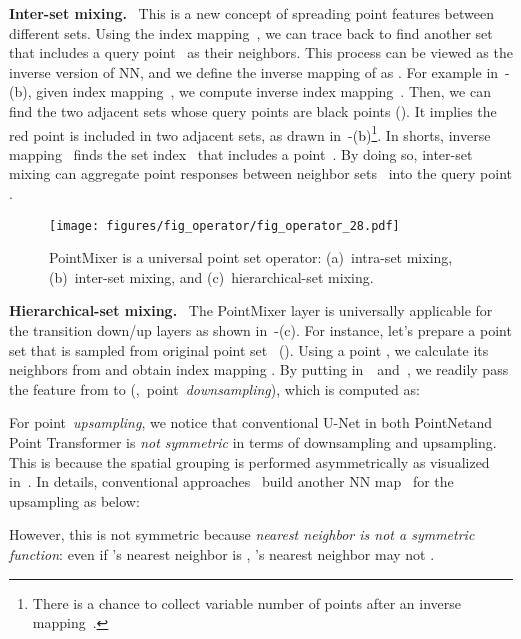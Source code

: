 \noindent \textbf{Inter-set mixing.} \
This is a new concept of spreading point features between different sets. Using the index mapping~, we can trace back to find another set~ that includes a query point~ as their neighbors. This process can be viewed as the inverse version of NN, and we define the inverse mapping of  as . 
For example in~-(b), given index mapping~, we compute inverse index mapping~. Then, we can find the two adjacent sets whose query points are black points ().
It implies the red point is included in two adjacent sets, as drawn in~\Fref{fig:fig_operator}-(\textcolor{black}{b})\footnote{There is a chance to collect variable number of points after an inverse mapping~.}. In shorts, inverse mapping~ finds the set index~ that includes a point~. By doing so, inter-set mixing can aggregate point responses between neighbor sets~ into the query point .



%
 \begin{figure*}[!t]
\centering
\texttt{[image: figures/fig\_operator/fig\_operator\_28.pdf]}
\vspace{-6mm}
\caption{PointMixer is a universal point set operator: (a)~intra-set mixing, (b)~inter-set mixing, and (c)~hierarchical-set mixing.}
\vspace{-2mm}
\label{fig:fig_operator}
\end{figure*} 



\noindent \textbf{Hierarchical-set mixing.} \
The PointMixer layer is universally applicable for the transition down/up layers as shown in~-(c).
For instance, let's prepare a point set  that is sampled from original point set~ ().
Using a point , we calculate its neighbors from  and obtain index mapping . By putting  in~\Eref{eq:set_attention_1}~and~, we readily pass the feature from  to  (\ie,~point~\emph{downsampling}), which is computed as:




For point~\emph{upsampling}, we notice that conventional U-Net in both PointNet\plusplus and Point Transformer is \emph{not symmetric} in terms of downsampling and upsampling. This is because the spatial grouping is performed asymmetrically as visualized in~. In details, conventional approaches~\cite{pointnet++,point-transformer,zhao2019pointweb} build another NN map~ for the upsampling as below:

However, this is not symmetric because \emph{nearest neighbor is not a symmetric function}: even if 's nearest neighbor is , 's nearest neighbor may not . 


